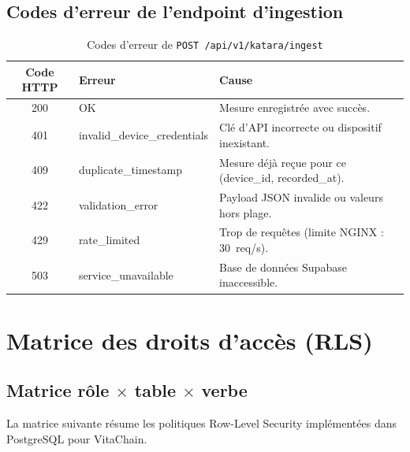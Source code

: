 \documentclass[12pt,a4paper]{report}
\begin{document}
\section{Codes d'erreur de l'endpoint d'ingestion}

\begin{table}[H]
  \centering
  \caption{Codes d'erreur de \texttt{POST /api/v1/katara/ingest}}
  \label{tab:erreurs}
  \begin{tabularx}{\linewidth}{clX}
    \toprule
    \textbf{Code HTTP} & \textbf{Erreur} & \textbf{Cause} \\
    \midrule
    200 & OK                        & Mesure enregistrée avec succès. \\
    401 & invalid\_device\_credentials & Clé d'API incorrecte ou dispositif
                                         inexistant. \\
    409 & duplicate\_timestamp       & Mesure déjà reçue pour ce
                                       (device\_id, recorded\_at). \\
    422 & validation\_error          & Payload JSON invalide ou valeurs hors
                                       plage. \\
    429 & rate\_limited              & Trop de requêtes (limite NGINX :
                                       30~req/s). \\
    503 & service\_unavailable       & Base de données Supabase inaccessible. \\
    \bottomrule
  \end{tabularx}
\end{table}

\chapter{Matrice des droits d'accès (RLS)}
\label{annexe:b}

\section{Matrice rôle \texorpdfstring{$\times$}{x} table \texorpdfstring{$\times$}{x} verbe}

La matrice suivante résume les politiques Row-Level Security implémentées dans
PostgreSQL pour VitaChain.
\end{document}
